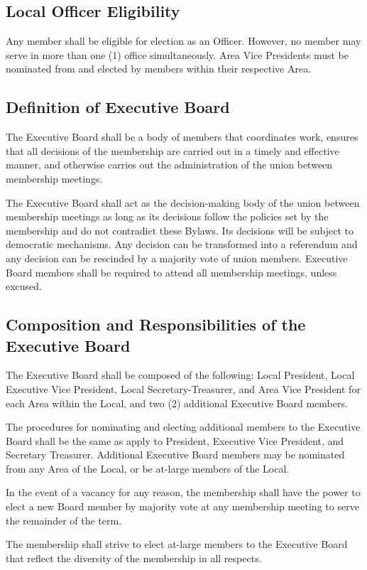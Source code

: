 \documentclass[11pt]{article}
\newcommand{\articlesection}[1]{\vspace{.25cm}\subsection{#1}}
\begin{document}
\articlesection{Local Officer Eligibility}
Any member shall be eligible for election as an Officer. However, no member may serve in more than one (1) office simultaneously. Area Vice Presidents must be nominated from and elected by members within their respective Area.

\articlesection{Definition of Executive Board}
\begin{paralist}
  \item The Executive Board shall be a body of members that coordinates work, ensures that all decisions of the membership are carried out in a timely and effective manner, and otherwise carries out the administration of the union between membership meetings.
  \item The Executive Board shall act as the decision-making body of the union between membership meetings as long as its decisions follow the policies set by the membership and do not contradict these Bylaws. Its decisions will be subject to democratic mechanisms. Any decision can be transformed into a referendum and any decision can be rescinded by a majority vote of union members. Executive Board members shall be required to attend all membership meetings, unless excused.
\end{paralist}

\articlesection{Composition and Responsibilities of the Executive Board}
\begin{paralist}
  \item The Executive Board shall be composed of the following: Local President, Local Executive Vice President, Local Secretary-Treasurer, and Area Vice President for each Area within the Local, and two (2) additional Executive Board members.
  \item The procedures for nominating and electing additional members to the Executive Board shall be the same as apply to President, Executive Vice President, and Secretary Treasurer. Additional Executive Board members may be nominated from any Area of the Local, or be at-large members of the Local.
  \item In the event of a vacancy for any reason, the membership shall have the power to elect a new Board member by majority vote at any membership meeting to serve the remainder of the term.
  \item The membership shall strive to elect at-large members to the Executive Board that reflect the diversity of the membership in all respects.
\end{paralist}
\end{document}
